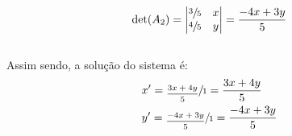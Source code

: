 \[
    \det(A_2) =
    \left|\begin{matrix}
        \sfrac{3}{5} & x \\
        \sfrac{4}{5} & y
    \end{matrix}\right|
    = \frac{-4x+3y}{5}
\]
\\

Assim sendo, a solução do sistema é:
\\

\begin{equation}
    \begin{aligned}
         & x' = \sfrac{\frac{3x+4y}{5}}{1} = \frac{3x+4y}{5}   \\
         & y' = \sfrac{\frac{-4x+3y}{5}}{1} = \frac{-4x+3y}{5}
    \end{aligned}
\end{equation}
\\
